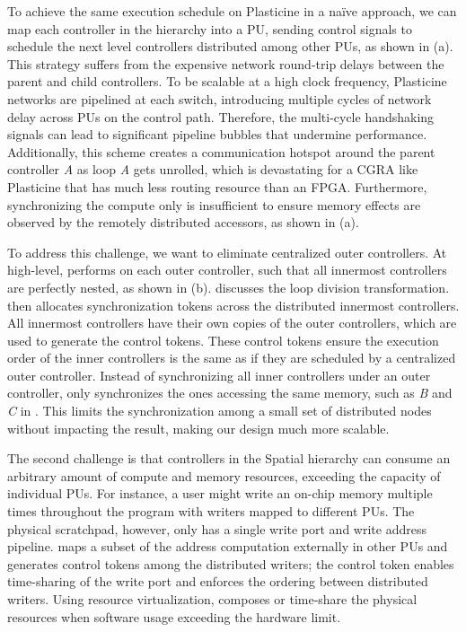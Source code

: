 To achieve the same execution schedule on Plasticine in a na\"ive approach, 
we can map each controller in the hierarchy into a PU, sending control signals to schedule the next
level controllers distributed among other PUs, as shown in  (a).
This strategy suffers from the expensive network round-trip delays between the parent and child controllers.
To be scalable at a high clock frequency, Plasticine networks are pipelined at each switch,
introducing multiple cycles of network delay across PUs on the control path.
Therefore, the multi-cycle handshaking signals can lead to significant pipeline bubbles that undermine performance.
Additionally, this scheme creates a communication hotspot around the parent controller \emph{A} as
loop \emph{A} gets unrolled, which is devastating for a CGRA
like Plasticine that has much less routing resource than an FPGA.
Furthermore, synchronizing the compute only is insufficient to ensure memory effects are observed by
the remotely distributed accessors, as shown in  (a).

To address this challenge, we want to eliminate centralized outer controllers.
At high-level, \name performs  on each outer controller, such that
all innermost controllers are perfectly nested, as shown in  (b).
 discusses the loop division transformation.
\name then allocates synchronization tokens across the distributed innermost controllers.
All innermost controllers have their own copies of the outer controllers, which are used to
generate the control tokens.
These control tokens ensure the execution order of the inner controllers is the same as if they are
scheduled by a centralized outer controller. Instead of synchronizing all inner controllers under an outer controller, \name only synchronizes the ones accessing the same memory, such as \emph{B} and
\emph{C} in . This limits the synchronization among a small set of
distributed nodes without impacting the result, 
making our design much more scalable.

The second challenge is that controllers in the Spatial hierarchy
can consume an arbitrary amount of compute and memory resources, exceeding the capacity of individual
PUs. For instance, a user might write an on-chip memory multiple times throughout the program with writers
mapped to different PUs. The physical scratchpad, however, only has a single write port and write address
pipeline. 
\name maps a subset of the address computation externally in other PUs and generates control tokens
among the distributed writers; the control token enables time-sharing of the write port and enforces the
ordering between distributed writers.
Using resource virtualization, \name composes or time-share the physical resources when software usage exceeding the hardware limit.

